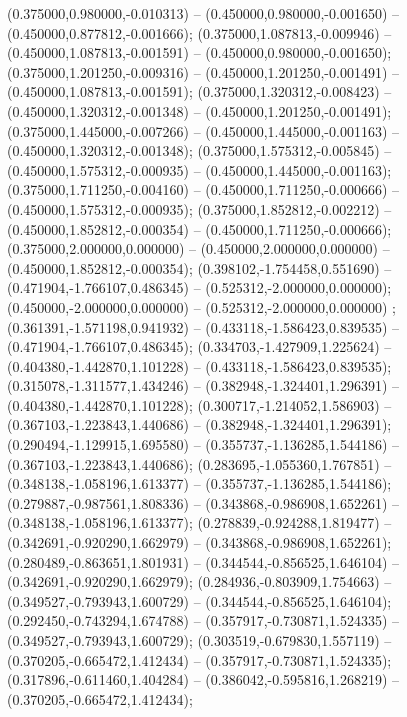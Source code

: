  (0.375000,0.980000,-0.010313) -- (0.450000,0.980000,-0.001650) -- (0.450000,0.877812,-0.001666);
 (0.375000,1.087813,-0.009946) -- (0.450000,1.087813,-0.001591) -- (0.450000,0.980000,-0.001650);
 (0.375000,1.201250,-0.009316) -- (0.450000,1.201250,-0.001491) -- (0.450000,1.087813,-0.001591);
 (0.375000,1.320312,-0.008423) -- (0.450000,1.320312,-0.001348) -- (0.450000,1.201250,-0.001491);
 (0.375000,1.445000,-0.007266) -- (0.450000,1.445000,-0.001163) -- (0.450000,1.320312,-0.001348);
 (0.375000,1.575312,-0.005845) -- (0.450000,1.575312,-0.000935) -- (0.450000,1.445000,-0.001163);
 (0.375000,1.711250,-0.004160) -- (0.450000,1.711250,-0.000666) -- (0.450000,1.575312,-0.000935);
 (0.375000,1.852812,-0.002212) -- (0.450000,1.852812,-0.000354) -- (0.450000,1.711250,-0.000666);
 (0.375000,2.000000,0.000000) -- (0.450000,2.000000,0.000000) -- (0.450000,1.852812,-0.000354);
 (0.398102,-1.754458,0.551690) -- (0.471904,-1.766107,0.486345) -- (0.525312,-2.000000,0.000000);
 (0.450000,-2.000000,0.000000) -- (0.525312,-2.000000,0.000000) ;
 (0.361391,-1.571198,0.941932) -- (0.433118,-1.586423,0.839535) -- (0.471904,-1.766107,0.486345);
 (0.334703,-1.427909,1.225624) -- (0.404380,-1.442870,1.101228) -- (0.433118,-1.586423,0.839535);
 (0.315078,-1.311577,1.434246) -- (0.382948,-1.324401,1.296391) -- (0.404380,-1.442870,1.101228);
 (0.300717,-1.214052,1.586903) -- (0.367103,-1.223843,1.440686) -- (0.382948,-1.324401,1.296391);
 (0.290494,-1.129915,1.695580) -- (0.355737,-1.136285,1.544186) -- (0.367103,-1.223843,1.440686);
 (0.283695,-1.055360,1.767851) -- (0.348138,-1.058196,1.613377) -- (0.355737,-1.136285,1.544186);
 (0.279887,-0.987561,1.808336) -- (0.343868,-0.986908,1.652261) -- (0.348138,-1.058196,1.613377);
 (0.278839,-0.924288,1.819477) -- (0.342691,-0.920290,1.662979) -- (0.343868,-0.986908,1.652261);
 (0.280489,-0.863651,1.801931) -- (0.344544,-0.856525,1.646104) -- (0.342691,-0.920290,1.662979);
 (0.284936,-0.803909,1.754663) -- (0.349527,-0.793943,1.600729) -- (0.344544,-0.856525,1.646104);
 (0.292450,-0.743294,1.674788) -- (0.357917,-0.730871,1.524335) -- (0.349527,-0.793943,1.600729);
 (0.303519,-0.679830,1.557119) -- (0.370205,-0.665472,1.412434) -- (0.357917,-0.730871,1.524335);
 (0.317896,-0.611460,1.404284) -- (0.386042,-0.595816,1.268219) -- (0.370205,-0.665472,1.412434);
